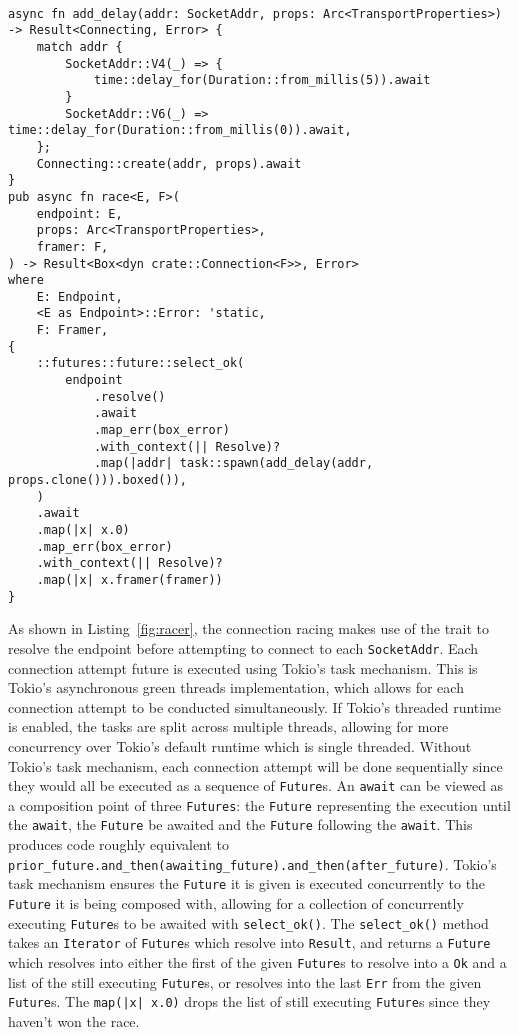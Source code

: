 \begin{lstlisting}[float=h, label=fig:racer, caption={The connection racing implementation, with the delay on IPv4
        addresses.}]

async fn add_delay(addr: SocketAddr, props: Arc<TransportProperties>) -> Result<Connecting, Error> {
    match addr {
        SocketAddr::V4(_) => {
            time::delay_for(Duration::from_millis(5)).await
        }
        SocketAddr::V6(_) => time::delay_for(Duration::from_millis(0)).await,
    };
    Connecting::create(addr, props).await
}
pub async fn race<E, F>(
    endpoint: E,
    props: Arc<TransportProperties>,
    framer: F,
) -> Result<Box<dyn crate::Connection<F>>, Error>
where
    E: Endpoint,
    <E as Endpoint>::Error: 'static,
    F: Framer,
{
    ::futures::future::select_ok(
        endpoint
            .resolve()
            .await
            .map_err(box_error)
            .with_context(|| Resolve)?
            .map(|addr| task::spawn(add_delay(addr, props.clone())).boxed()),
    )
    .await
    .map(|x| x.0)
    .map_err(box_error)
    .with_context(|| Resolve)?
    .map(|x| x.framer(framer))
}
\end{lstlisting}

As shown in Listing~\ref{fig:racer}, the connection racing makes use of the \Endpoint{} trait to resolve the
endpoint before attempting to connect to each \texttt{SocketAddr}.
Each connection attempt future is executed using Tokio's task mechanism.
This is Tokio's asynchronous green threads implementation, which allows for each connection attempt to be conducted
simultaneously.
If Tokio's threaded runtime is enabled, the tasks are split across multiple threads, allowing for more concurrency over
Tokio's default runtime which is single threaded.
Without Tokio's task mechanism, each connection attempt will be done sequentially since they would all be executed as a
sequence of \texttt{Future}s.
An \texttt{await} can be viewed as a composition point of three \texttt{Futures}: the \texttt{Future} representing the
execution until the \texttt{await}, the \texttt{Future} be awaited and the \texttt{Future} following the \texttt{await}.
This produces code roughly equivalent to \lstinline{prior_future.and_then(awaiting_future).and_then(after_future)}.
Tokio's task mechanism ensures the \texttt{Future} it is given is executed concurrently to the \texttt{Future} it is
being composed with, allowing for a collection of concurrently executing \texttt{Future}s to be awaited with
\texttt{select\_ok()}.
The \texttt{select\_ok()} method takes an \texttt{Iterator} of \texttt{Future}s which resolve into \texttt{Result}, and
returns a \texttt{Future} which resolves into either the first of the given \texttt{Future}s to resolve into a
\texttt{Ok} and a list of the still executing \texttt{Future}s, or resolves into the last \texttt{Err} from the given
\texttt{Future}s.
The \texttt{map(|x| x.0)} drops the list of still executing \texttt{Future}s since they haven't won the race.

